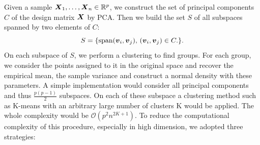 Given a sample $\boldsymbol X_1,\dots,\boldsymbol X_n\in{\mathbb R}^p$, we construct the set of principal components $C$ of the design matrix $\boldsymbol X$ by PCA. Then we build the set $S$ of all subspaces spanned by two elements of $C$:
\begin{equation}
  S = \{\textnormal{span}(\boldsymbol v_i,\boldsymbol v_j),\, (\boldsymbol v_i,\boldsymbol v_j) \in C.\}.
\end{equation}
On each subspace of $S$, we perform a clustering to find groups. For each group, we consider the points assigned to it in the original space and recover the empirical mean, the sample variance and construct a normal density with these parameters. A simple implementation would consider all principal components and thus $\frac{p(p-1)}{2}$ subspaces. On each of these subspace a clustering method such as K-means with an arbitrary large number of clusters K would be applied. The whole complexity would be $\mathcal{O}(p^2n^{2K+1})$. To reduce the computational complexity of this procedure, especially in high dimension, we adopted three strategies:
